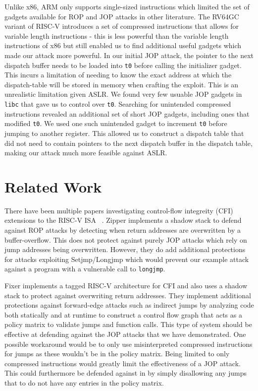 Unlike x86, ARM only supports single-sized instructions which limited the set of
gadgets available for ROP and JOP attacks in other literature.
The RV64GC variant of RISC-V introduces a set of compressed instructions that
allows for variable length instructions - this is less powerful than the
variable length instructions of x86 but still enabled us to find additional useful
gadgets which made our attack more powerful. In our initial JOP attack, the pointer
to the next dispatch buffer needs to be loaded into \verb|t0| before calling the
initializer gadget. This incurs a limitation of needing to know the exact
address at which the dispatch-table will be stored in memory when crafting the exploit.
This is an unrealistic limitation given ASLR. We found very few usuable JOP gadgets in
\verb|libc| that gave us to control over \verb|t0|. Searching for unintended
compressed instructions revealed an additional set of short JOP gadgets, including ones
that modified \verb|t0|. We used one such unintended gadget to increment \verb|t0|
before jumping to another register. This allowed us to construct a dispatch table that
did not need to contain pointers to the next dispatch buffer in the dispatch table,
making our attack much more feasible against ASLR.

\section{Related Work}
There have been multiple papers investigating control-flow integreity (CFI) 
extensions to the RISC-V ISA ~\cite{zipper,fixer}. Zipper \cite{zipper}
implements a shadow stack to defend against ROP attacks by detecting when return
addresses are overwritten by a buffer-overflow. This does not protect against
purely JOP attacks which rely on jump addresses being overwritten. However, they
do add additional protections for attacks exploiting Setjmp/Longjmp which would
prevent our example attack against a program with a vulnerable call to 
\verb|longjmp|.

Fixer \cite{fixer} implements a tagged RISC-V architecture for CFI and also 
uses a shadow stack to protect against overwriting return addresses. They 
implement additional protections against forward-edge attacks such as indirect
jumps by analyzing code both statically and at runtime to construct a control
flow graph that acts as a policy matrix to validate jumps and function calls.
This type of system should be effective at defending against the JOP attacks
that we have demonstrated. One possible workaround would be to only use
misinterpreted compressed instructions for jumps as these wouldn't be in the
policy matrix. Being limited to only compressed instructions would greatly limit
the effectiveness of a JOP attack. This could furthermore be defended against
in by simply disallowing any jumps that to do not have any entries in the policy
matrix.
